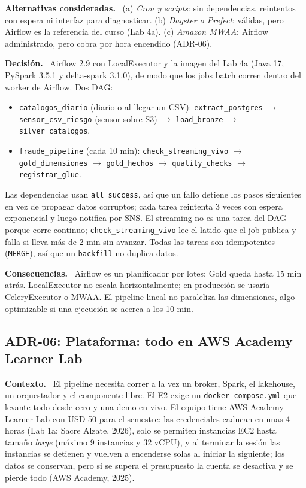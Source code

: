 \documentclass[12pt,letterpaper]{article}
\newcommand{\code}[1]{{\small\texttt{#1}}}
\newcommand{\adrpart}[1]{\textbf{#1.}~}
\begin{document}
\adrpart{Alternativas consideradas} (a) \emph{Cron y scripts}: sin dependencias, reintentos con espera ni interfaz para diagnosticar. (b) \emph{Dagster o Prefect}: válidas, pero Airflow es la referencia del curso (Lab 4a). (c) \emph{Amazon MWAA}: Airflow administrado, pero cobra por hora encendido (ADR-06).

\adrpart{Decisión} Airflow 2.9 con LocalExecutor y la imagen del Lab 4a (Java 17, PySpark 3.5.1 y delta-spark 3.1.0), de modo que los jobs batch corren dentro del worker de Airflow. Dos DAG:
\begin{itemize}\sloppy
  \item \code{catalogos\_diario} (diario o al llegar un CSV): \code{extract\_postgres} $\rightarrow$ \code{sensor\_csv\_riesgo} (sensor sobre S3) $\rightarrow$ \code{load\_bronze} $\rightarrow$ \code{silver\_catalogos}.
  \item \code{fraude\_pipeline} (cada 10 min): \code{check\_streaming\_vivo} $\rightarrow$ \code{gold\_dimensiones} $\rightarrow$ \code{gold\_hechos} $\rightarrow$ \code{quality\_checks} $\rightarrow$ \code{registrar\_glue}.
\end{itemize}
\noindent Las dependencias usan \code{all\_success}, así que un fallo detiene los pasos siguientes en vez de propagar datos corruptos; cada tarea reintenta 3 veces con espera exponencial y luego notifica por SNS. El streaming no es una tarea del DAG porque corre continuo; \code{check\_streaming\_vivo} lee el latido que el job publica y falla si lleva más de 2 min sin avanzar. Todas las tareas son idempotentes (\code{MERGE}), así que un \code{backfill} no duplica datos.

\adrpart{Consecuencias} Airflow es un planificador por lotes: Gold queda hasta 15 min atrás. LocalExecutor no escala horizontalmente; en producción se usaría CeleryExecutor o MWAA. El pipeline lineal no paraleliza las dimensiones, algo optimizable si una ejecución se acerca a los 10 min.

\subsection*{ADR-06: Plataforma: todo en AWS Academy Learner Lab}

\adrpart{Contexto} El pipeline necesita correr a la vez un broker, Spark, el lakehouse, un orquestador y el componente libre. El E2 exige un \code{docker-compose.yml} que levante todo desde cero y una demo en vivo. El equipo tiene AWS Academy Learner Lab con USD 50 para el semestre: las credenciales caducan en unas 4 horas (Lab 1a; Sacre Alzate, 2026), solo se permiten instancias EC2 hasta tamaño \emph{large} (máximo 9 instancias y 32 vCPU), y al terminar la sesión las instancias se detienen y vuelven a encenderse solas al iniciar la siguiente; los datos se conservan, pero si se supera el presupuesto la cuenta se desactiva y se pierde todo (AWS Academy, 2025).
\end{document}
